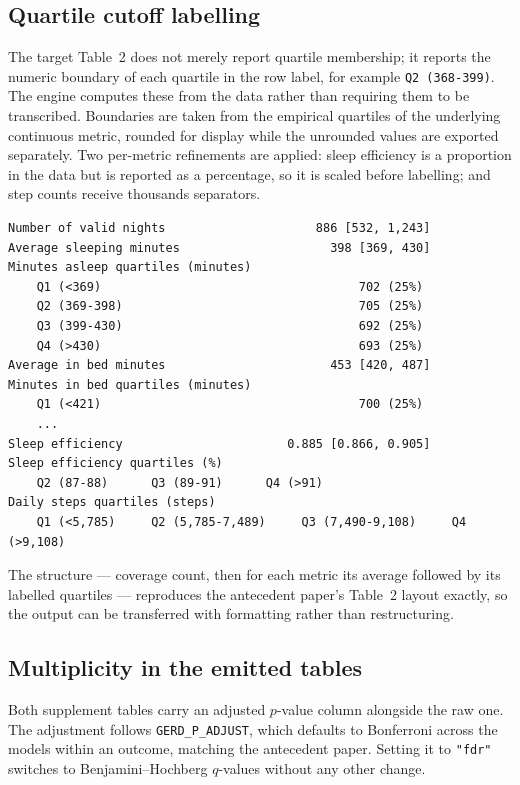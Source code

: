 \documentclass[11pt]{article}
\newcommand{\code}[1]{\texttt{\small #1}}
\begin{document}
\subsection{Quartile cutoff labelling}
The target Table~2 does not merely report quartile membership; it reports the numeric boundary of each
quartile in the row label, for example \code{Q2 (368-399)}. The engine computes these from the data
rather than requiring them to be transcribed. Boundaries are taken from the empirical quartiles of the
underlying continuous metric, rounded for display while the unrounded values are exported separately.
Two per-metric refinements are applied: sleep efficiency is a proportion in the data but is reported
as a percentage, so it is scaled before labelling; and step counts receive thousands separators.

\begin{lstlisting}[caption={Table 2 as produced by the code (excerpt, synthetic data).}]
Number of valid nights                     886 [532, 1,243]
Average sleeping minutes                     398 [369, 430]
Minutes asleep quartiles (minutes)
    Q1 (<369)                                    702 (25%)
    Q2 (369-398)                                 705 (25%)
    Q3 (399-430)                                 692 (25%)
    Q4 (>430)                                    693 (25%)
Average in bed minutes                       453 [420, 487]
Minutes in bed quartiles (minutes)
    Q1 (<421)                                    700 (25%)
    ...
Sleep efficiency                       0.885 [0.866, 0.905]
Sleep efficiency quartiles (%)
    Q2 (87-88)      Q3 (89-91)      Q4 (>91)
Daily steps quartiles (steps)
    Q1 (<5,785)     Q2 (5,785-7,489)     Q3 (7,490-9,108)     Q4 (>9,108)
\end{lstlisting}

\noindent The structure --- coverage count, then for each metric its average followed by its labelled
quartiles --- reproduces the antecedent paper's Table~2 layout exactly, so the output can be
transferred with formatting rather than restructuring.

\subsection{Multiplicity in the emitted tables}
Both supplement tables carry an adjusted $p$-value column alongside the raw one. The adjustment
follows \code{GERD_P_ADJUST}, which defaults to Bonferroni across the models within an outcome,
matching the antecedent paper. Setting it to \code{"fdr"} switches to Benjamini--Hochberg
$q$-values without any other change.
\end{document}
